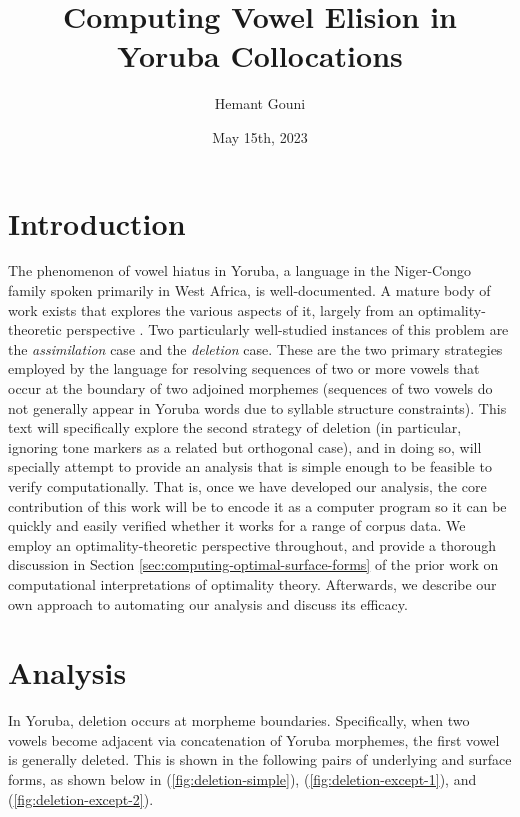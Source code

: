 \documentclass[12pt]{article}
\title{Computing Vowel Elision in Yoruba Collocations}
\author{Hemant Gouni}
\date{May 15th, 2023}
\newcommand{\pref}[1]{(\ref{#1})}
\begin{document}
\maketitle

\section{Introduction}


The phenomenon of vowel hiatus in Yoruba, a language in the Niger-Congo family
spoken primarily in West Africa, is well-documented. A mature body of work
exists that explores the various aspects of it, largely from an
optimality-theoretic perspective \cite{ola2002yoruba, seidl2000yoruba,
pulleyblank1988vowel}. Two particularly well-studied instances of this problem
are the \textit{assimilation} case and the \textit{deletion} case. These are the
two primary strategies employed by the language for resolving sequences of two
or more vowels that occur at the boundary of two adjoined morphemes
(sequences of two vowels do not generally appear in Yoruba words due to
syllable structure constraints). This text will specifically explore the
second strategy of deletion (in particular, ignoring tone markers as a related
but orthogonal case), and in doing so, will specially attempt to provide
an analysis that is simple enough to be feasible to verify computationally. That
is, once we have developed our analysis, the core contribution of this work
will be to encode it as a computer program so it can be quickly and easily
verified whether it works for a range of corpus data. We employ an
optimality-theoretic perspective throughout, and provide a thorough discussion
in Section \ref{sec:computing-optimal-surface-forms} of the prior work on
computational interpretations of optimality theory. Afterwards, we describe
our own approach to automating our analysis and discuss its efficacy.

\section{Analysis}

In Yoruba, deletion occurs at morpheme boundaries. Specifically, when two
vowels become adjacent via concatenation of Yoruba morphemes, the first vowel
is generally deleted. This is shown in the following pairs of underlying and
surface forms, as shown below in \pref{fig:deletion-simple},
\pref{fig:deletion-except-1}, and \pref{fig:deletion-except-2}.
\end{document}
